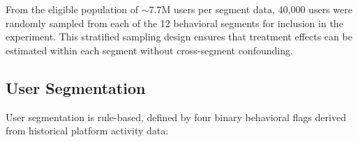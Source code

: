 \documentclass[12pt,a4paper]{article}
\begin{document}
From the eligible population of $\sim$7.7M users per segment data, 40,000 users
were randomly sampled from each of the 12 behavioral segments for inclusion in the
experiment. This stratified sampling design ensures that treatment effects can be
estimated within each segment without cross-segment confounding.

\subsection{User Segmentation}

User segmentation is rule-based, defined by four binary behavioral flags derived from
historical platform activity data:

\begin{table}[H]
  \centering
  \caption{User Segment Definitions (12 Behavioral Groups)}
  \label{tab:segments}
\end{table}
\end{document}
